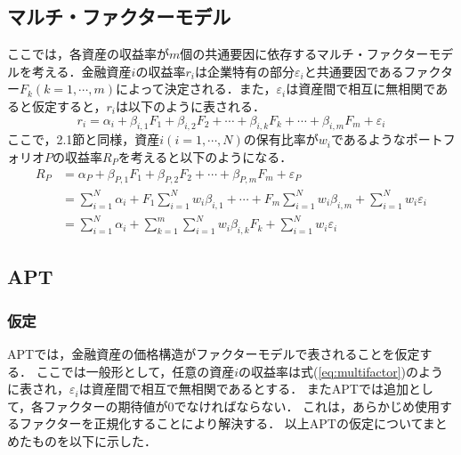 ﻿\documentclass[a4paper]{jarticle}
\begin{document}
\subsection{マルチ・ファクターモデル}
ここでは，各資産の収益率が$m$個の共通要因に依存するマルチ・ファクターモデルを考える．金融資産$i$の収益率$r_i$は企業特有の部分$\varepsilon_i$と共通要因であるファクター$F_k(k=1,\cdots,m)$によって決定される．また，$\varepsilon_i$は資産間で相互に無相関であると仮定すると，$r_i$は以下のように表される．
\begin{equation}
r_i = \alpha_i + \beta_{i,1}F_1 + \beta_{i,2}F_2 + \cdots + \beta_{i,k}F_k + \cdots + \beta_{i,m}F_m + \varepsilon_i
\label{eq:multifactor}
\end{equation}
ここで，2.1節と同様，資産$i(i=1,\cdots,N)$の保有比率が$w_i$であるようなポートフォリオ$P$の収益率$R_P$を考えると以下のようになる．
\begin{equation}
\begin{split}
R_P &= \alpha_P + \beta_{P,1} F_1 + \beta_{P,2} F_2 + \cdots + \beta_{P,m} F_m + \varepsilon_P\\
&=\sum_{i=1}^N \alpha_i + F_1 \sum_{i=1}^N w_i \beta_{i,1} + \cdots + F_m \sum_{i=1}^N w_i \beta_{i,m} + \sum_{i=1}^N w_i\varepsilon_i\\
&= \sum_{i=1}^N \alpha_i + \sum_{k=1}^m \sum_{i=1}^N w_i \beta_{i,k} F_k + \sum_{i=1}^N w_i\varepsilon_i
\label{eq:multi}
\end{split}
\end{equation}


\subsection{APT}

\subsubsection{仮定}
APTでは，金融資産の価格構造がファクターモデルで表されることを仮定する．
ここでは一般形として，任意の資産$i$の収益率は式(\ref{eq:multifactor})のように表され，$\varepsilon_i$は資産間で相互で無相関であるとする．
またAPTでは追加として，各ファクターの期待値が0でなければならない．
これは，あらかじめ使用するファクターを正規化することにより解決する．
以上APTの仮定についてまとめたものを以下に示した．
\end{document}

